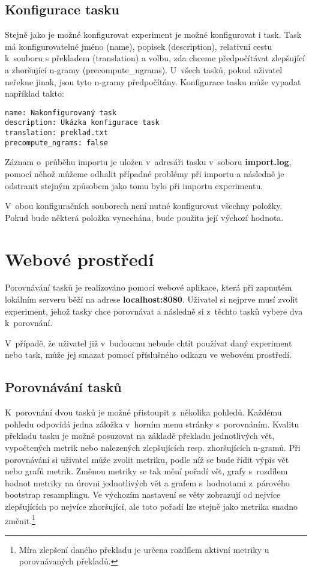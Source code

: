 \subsection{Konfigurace tasku}
Stejně jako je možné konfigurovat experiment je možné konfigurovat i task.
Task má konfigurovatelné jméno (name), popisek (description),
  relativní cestu k~souboru s překladem (translation) a volbu,
  zda chceme předpočítávat zlepšující a zhoršující \mbox{n-gramy} (precompute\_ngrams).
U~všech tasků, pokud uživatel neřekne jinak, 
  jsou tyto \mbox{n-gramy} předpočítány.
Konfigurace tasku může vypadat například takto:

\begin{verbatim}
name: Nakonfigurovaný task
description: Ukázka konfigurace task
translation: preklad.txt
precompute_ngrams: false
\end{verbatim}

Záznam o~průběhu importu je uložen v~adresáři tasku v~soboru \textbf{import.log},
  pomocí něhož můžeme odhalit případné problémy při importu
  a následně je odstranit stejným způsobem jako tomu bylo při importu experimentu.

V~obou konfiguračních souborech není nutné konfigurovat všechny položky.
Pokud bude některá položka vynechána,
  bude použita její výchozí hodnota. 

\section{Webové prostředí}
Porovnávání tasků je realizováno pomocí webové aplikace,
  která při zapnutém lokálním serveru běží na adrese \textbf{localhost:8080}.
Uživatel si nejprve musí zvolit experiment,
  jehož tasky chce porovnávat a následně si z~těchto tasků vybere dva k~porovnání.

V~případě,
  že uživatel již v~budoucnu nebude chtít používat daný experiment nebo task,
  může jej smazat pomocí příslušného odkazu ve webovém prostředí.

\subsection{Porovnávání tasků}
K~porovnání dvou tasků je možné přistoupit z~několika pohledů.
Každému pohledu odpovídá jedna záložka v~horním menu stránky s~porovnáním.
Kvalitu překladu tasku je možné posuzovat na základě překladu jednotlivých vět,
  vypočtených metrik nebo nalezených zlepšujících resp. zhoršujících \mbox{n-gramů}.
Při porovnávání si uživatel může zvolit metriku,
  podle níž se bude řídit výpis vět nebo grafů metrik.
Změnou metriky se tak mění pořadí vět,
  grafy s~rozdílem hodnot metriky na úrovni jednotlivých vět
  a grafem s~hodnotami z~párového bootstrap resamplingu.
Ve výchozím nastavení se věty zobrazují od nejvíce zlepšujících po nejvíce zhoršující,
  ale toto pořadí lze stejně jako metrika snadno změnit.\footnote{
    Míra zlepšení daného překladu je určena rozdílem aktivní metriky u porovnávaných překladů.
  }

